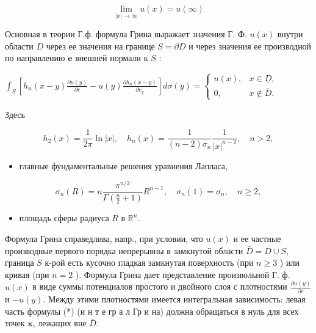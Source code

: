 \documentclass[10pt]{article}
\begin{document}
\[

\lim _{|x| \rightarrow \infty} u(x)=u(\infty)

\]



Основная в теории Г.ф. формула Грина выражает значения Г. Ф. $u(x)$ внутри области $D$ через ее значения на границе $S=\partial D$ и через значения ее производной по направлению $\boldsymbol{e}$ внешней нормали к $S$ :



$\int_{S}\left[h_{n}(x-y) \frac{\partial u(y)}{\partial e}-u(y) \frac{\partial h_{n}(x-y)}{\partial e_{y}}\right] d \sigma(y)=\left\{\begin{array}{cc}u(x), & x \in \underline{D}, \\ 0, & x \notin \bar{D} .\end{array}\right.$



Здесь



\[

h_{2}(x)=\frac{1}{2 \pi} \ln |x|, \quad h_{n}(x)=\frac{1}{(n-2) \sigma_{n}} \frac{1}{|x|^{n-2}}, \quad n>2,

\]



\begin{itemize}

  \item главные фундаментальные решения уравнения Лапласа,

\end{itemize}



\[

\sigma_{n}(R)=n \frac{\pi^{n / 2}}{\Gamma\left(\frac{n}{2}+1\right)} R^{n-1}, \quad \sigma_{n}(1)=\sigma_{n}, \quad n \geqslant 2,

\]



\begin{itemize}

  \item площадь сферы радиуса $R$ в $\mathbb{R}^{n}$.

\end{itemize}



Формула Грина справедлива, напр., при условии, что $u(x)$ и ее частные производные первого порядка непрерывны в замкнутой области $\bar{D}=D \cup S$, граница $S$ к-рой есть кусочно гладкая замкнутая поверхность (при $n \geqslant 3$ ) или кривая (при $n=2$ ). Формула Грина дает представление произвольной Г. ф. $u(x)$ в виде суммы потенциалов простого и двойного слоя с плотностями $\frac{\partial u(y)}{\partial e}$ и $-u(y)$. Между этими плотностями имеется интегральная зависимость: левая часть формулы (*) (и н т е гр а л Гр и на) должна обращаться в нуль для всех точек $\boldsymbol{x}$, лежащих вне $\bar{D}$.
\end{document}
